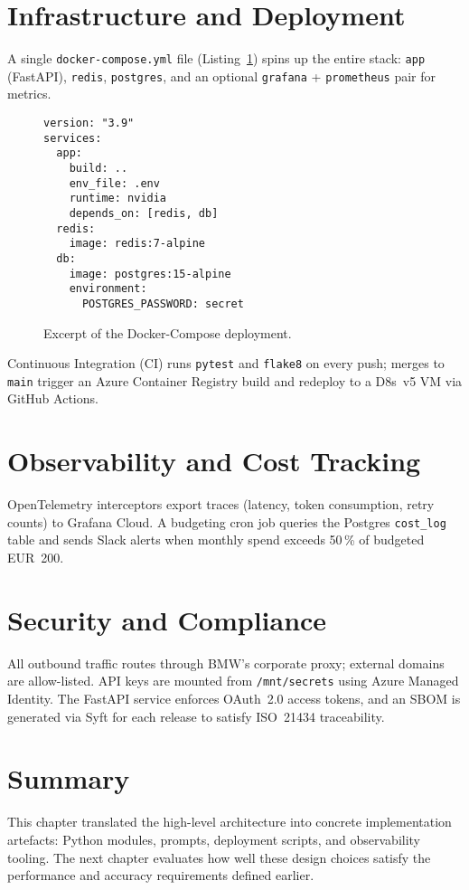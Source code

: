 \section{Infrastructure and Deployment}
A single \texttt{docker-compose.yml} file (Listing~\ref{lst:compose}) spins up the entire stack: \texttt{app} (FastAPI), \texttt{redis}, \texttt{postgres}, and an optional \texttt{grafana} + \texttt{prometheus} pair for metrics.
\begin{figure}[H]
\centering
\begin{minipage}{0.9\textwidth}
\begin{verbatim}
version: "3.9"
services:
  app:
    build: ..
    env_file: .env
    runtime: nvidia
    depends_on: [redis, db]
  redis:
    image: redis:7-alpine
  db:
    image: postgres:15-alpine
    environment:
      POSTGRES_PASSWORD: secret
\end{verbatim}
\end{minipage}
\caption{Excerpt of the Docker-Compose deployment.}
\label{lst:compose}
\end{figure}
Continuous Integration (CI) runs \texttt{pytest} and \texttt{flake8} on every push; merges to \texttt{main} trigger an Azure Container Registry build and redeploy to a D8s~v5 VM via GitHub Actions.

\section{Observability and Cost Tracking}
OpenTelemetry interceptors export traces (latency, token consumption, retry counts) to Grafana Cloud.  A budgeting cron job queries the Postgres \texttt{cost\_log} table and sends Slack alerts when monthly spend exceeds 50\,\% of budgeted EUR~200.

\section{Security and Compliance}\label{sec:security}
All outbound traffic routes through BMW's corporate proxy; external domains are allow-listed.  API keys are mounted from \texttt{/mnt/secrets} using Azure Managed Identity.  The FastAPI service enforces OAuth~2.0 access tokens, and an SBOM is generated via Syft for each release to satisfy ISO~21434 traceability.

\section{Summary}
This chapter translated the high-level architecture into concrete implementation artefacts: Python modules, prompts, deployment scripts, and observability tooling.  The next chapter evaluates how well these design choices satisfy the performance and accuracy requirements defined earlier.